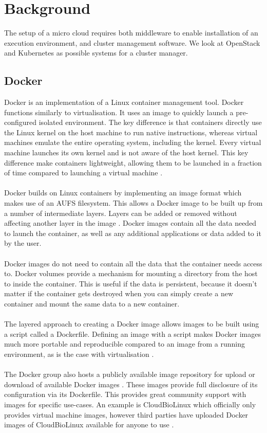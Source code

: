 \documentclass{sig-alternate-05-2015}
\begin{document}
\section{Background}
The setup of a micro cloud requires both middleware to enable installation of an execution environment, and cluster management software. We look at OpenStack and Kubernetes as possible systems for a cluster manager.


\subsection{Docker}
Docker is an implementation of a Linux container management tool. Docker functions similarly to virtualisation. It uses an image to quickly launch a pre-configured isolated environment. The key difference is that containers directly use the Linux kernel on the host machine to run native instructions, whereas virtual machines emulate the entire operating system, including the kernel. Every virtual machine launches its own kernel and is not aware of the host kernel. This key difference make containers lightweight, allowing them to be launched in a fraction of time compared to launching a virtual machine \cite{joy2015performance}. 
\\\\
Docker builds on Linux containers by implementing an image format which makes use of an AUFS filesystem. This allows a Docker image to be built up from a number of intermediate layers. Layers can be added or removed without affecting another layer in the image \cite{boettiger2014introduction}. Docker images contain all the data needed to launch the container, as well as any additional applications or data added to it by the user.
\\\\
Docker images do not need to contain all the data that the container needs access to. Docker volumes provide a mechanism for mounting a directory from the host to inside the container. This is useful if the data is persistent, because it doesn't matter if the container gets destroyed when you can simply create a new container and mount the same data to a new container. 
\\\\
The layered approach to creating a Docker image allows images to be built using a script called a Dockerfile. Defining an image with a script makes Docker images much more portable and reproducible compared to an image from a running environment, as is the case with virtualisation \cite{boettiger2014introduction}.
\\\\
The Docker group also hosts a publicly available image repository for upload or download of available Docker images \cite{dockerhub}. These images provide full disclosure of its configuration via its Dockerfile. This provides great community support with images for specific use-cases. An example is CloudBioLinux which officially only provides virtual machine images, however third parties have uploaded Docker images of CloudBioLinux available for anyone to use \cite{dockerbiolinux}.
\end{document}
